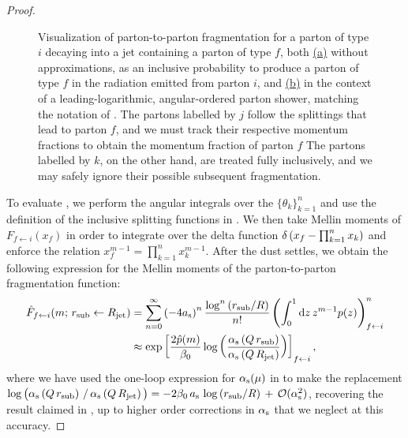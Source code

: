 \begin{proof}
\begin{figure}[t!]
    \caption[Visualization of parton-to-parton fragmentation for a parton of type \(i\) decaying into a jet containing a parton of type \(f\).]
    {
        Visualization of parton-to-parton fragmentation for a parton of type \(i\) decaying into a jet containing a parton of type \(f\), both
        \hyperref[fig:shower:cartoon:fragmentation1]{(a)}
        without approximations, as an inclusive probability to produce a parton of type \(f\) in the radiation emitted from parton \(i\), and
        \hyperref[fig:shower:cartoon:fragmentation2]{(b)}
        in the context of a leading-logarithmic, angular-ordered parton shower, matching the notation of .
        The partons labelled by \(j\) follow the splittings that lead to parton \(f\), and we must track their respective momentum fractions to obtain the momentum fraction of parton \(f\)
        The partons labelled by \(k\), on the other hand, are treated fully inclusively, and we may safely ignore their possible subsequent fragmentation.
    }

    \label{fig:shower:cartoon:fragmentation}
\end{figure}




To evaluate , we perform the angular integrals over the \(\{\theta_k\}_{k = 1}^n\) and use the definition of the inclusive splitting functions in .
%
We then take Mellin moments of \(F_{f\leftarrow i}(x_f)\) in order to integrate over the delta function \(\delta \left(x_f - \prod_{k=1}^n x_k\right)\) and enforce the relation \(x_f^{m-1} = \prod_{k=1}^n x_k^{m-1}\).
%
After the dust settles, we obtain the following expression for the Mellin moments of the parton-to-parton fragmentation function:
\begin{subequations}
\label{eq:ll_fragmentation_repeat}
\begin{align}
    \label{eq:ll_fragmentation_angle}
    \hat{F}_{f \leftarrow i}(m;\,\rsub \leftarrow \Rjet)
    &=
    \sum_{n=0}^\infty
    \le(-4\as\ri)^n
    \frac{\log^n\le(\rsub/R\ri)}{n!}
    \le(
        \int_0^1 \dd z\,
        z^{m-1} p(z)
    \ri)^n_{f\leftarrow i}
    \\
    &\approx
    \exp\le[
        \frac{2\hat{p}(m)}{\beta_0}
        \log\le(
        \frac{
            \alphas\le(Q\,\rsub\ri)
        }{
            \alphas\le(Q\,\Rjet\ri)
        }\ri)
    \ri]_{f \leftarrow i}
    ,
\end{align}
\end{subequations}
where we have used the one-loop expression for \(\alpha_{\mathrm{s}}(\mu)\) in  to make the replacement \(
    \log\big(
        \alpha_{\mathrm{s}}\left(Q\,r_\text{sub}\right)
        \,/\,
        \alpha_{\mathrm{s}}\left(Q\,R_\text{jet}\right)
    \big)
    =
    -2 \beta_0 \, a_{\mathrm{s}} \,
    \log\left(r_\text{sub}/R\right)
    \,
    +
    \,
    \mathcal{O}(\alpha_{\mathrm{s}}^2)
\), recovering the result claimed in , up to higher order corrections in \(\alpha_{\mathrm{s}}\) that we neglect at this accuracy.
\end{proof}


